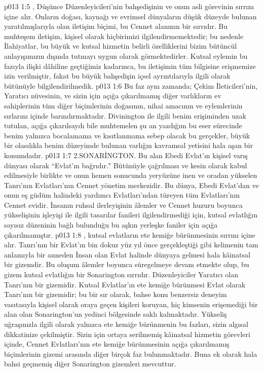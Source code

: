 \vs p013 1:5 , Düşünce Düzenleyicileri’nin bahşedişinin ve onun asli görevinin sırrını içine alır. Onların doğası, kaynağı ve evrimsel dünyaların düşük düzeyde bulunan yaratılmışlarıyla olan iletişim biçimi, bu Cennet alanının bir sırrıdır. Bu muhteşem iletişim, kişisel olarak hiçbirimizi ilgilendirmemektedir; bu nedenle İlahiyatlar, bu büyük ve kutsal hizmetin belirli özelliklerini bizim bütüncül anlayışımızın dışında tutmayı uygun olarak görmektedirler. Kutsal eylemin bu fazıyla ilişki dâhiline geçtiğimiz kadarınca, bu iletişimin tüm bilgisine erişmemize izin verilmiştir, fakat bu büyük bahşedişin içsel ayrıntılarıyla ilgili olarak bütünüyle bilgilendirilmedik.
\vs p013 1:6 Bu faz aynı zamanda; Çekim İleticileri’nin, Yaratıcı nüvesinin, ve sizin için açığa çıkarılmamış diğer varlıkların ev sahiplerinin tüm diğer biçimlerinin doğasının, nihai amacının ve eylemlerinin sırlarını içinde barındırmaktadır. Divinington ile ilgili benim erişiminden uzak tutulan, açığa çıkarılsaydı bile muhtemelen şu an yazdığım bu eser sürecinde benim yalnızca bocalamama ve kısıtlanmama sebep olacak bu gerçekler, büyük bir olasılıkla benim düzeyimde bulunan varlığın kavramsal yetisini hala aşan bir konumdadır.
\vs p013 1:7 2.\bibnobreakspace SONARİNGTON. Bu alan Ebedi Evlat’ın kişisel varış dünyası olarak “Evlat’ın bağrıdır." Bütünüyle çağrılması ve kesin olarak kabul edilmesiyle birlikte ve onun hemen sonucunda yeryüzüne inen ve oradan yükselen Tanrı'nın Evlatları’nın Cennet yönetim merkezidir. Bu dünya, Ebedi Evlat’dan ve onun eş güdüm halindeki yardımcı Evlatları’ndan türeyen tüm Evlatları’nın Cennet evidir. İnsanın ruhsal ilerleyişinin âlemler ve Cennet huzuru boyunca yükselişinin işleyişi ile ilgili tasarılar fanileri ilgilendirmediği için, kutsal evlatlığın sayısız düzeninin bağlı bulunduğu bu aşkın yerleşke faniler için açığa çıkarılmamıştır.
\vs p013 1:8 , kutsal evlatların ete kemiğe bürünmesinin sırrını içine alır. Tanrı’nın bir Evlat’ın bin dokuz yüz yıl önce gerçekleştiği gibi kelimenin tam anlamıyla bir anneden İnsan olan Evlat halinde dünyaya gelmesi hala kâinatsal bir gizemdir. Bu oluşum âlemler boyunca süregelmeye devam etmekte olup, bu gizem kutsal evlatlığın bir Sonarington sırrıdır. Düzenleyiciler Yaratıcı olan Tanrı’nın bir gizemidir. Kutsal Evlatlar’ın ete kemiğe bürünmesi Evlat olarak Tanrı’nın bir gizemidir; bu bir sır olarak, bahse konu benzersiz deneyim vasıtasıyla kişisel olarak oraya geçen kişileri koruyan, hiç kimsenin erişemediği bir alan olan Sonarington’un yedinci bölgesinde saklı kalmaktadır. Yükseliş uğraşınızla ilgili olarak yalnızca ete kemiğe bürünmenin bu fazları, sizin algısal dikkatinize çekilmiştir. Sizin için ortaya serilmemiş kâinatsal hizmetin görevleri içinde, Cennet Evlatları’nın ete kemiğe bürünmesinin açığa çıkarılmamış biçimlerinin gizemi arasında diğer birçok faz bulunmaktadır. Buna ek olarak hala bahsi geçmemiş diğer Sonarington gizemleri mevcuttur.

